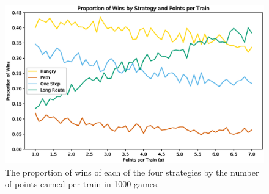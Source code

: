 \begin{figure}[h]
    \centering
    \includegraphics[scale=.65]{figures/points}
    \caption{The proportion of wins
    of each of the four strategies
    by the number of points
    earned per train in 1000 games.}
    \label{fig:points}
\end{figure}
